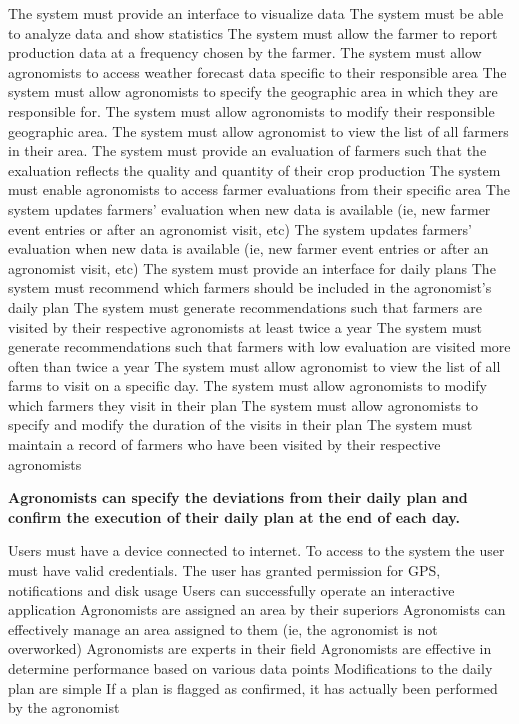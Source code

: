 \begin{itemize}
\begin{itemize}
 The system must provide an interface to visualize data
 The system must be able to analyze data and show statistics
 The system must allow the farmer to report production data at a frequency chosen by the farmer.
 The system must allow agronomists to access weather forecast data specific to their responsible area
 The system must allow agronomists to specify the geographic area in which they are responsible for.
 The system must allow agronomists to modify their responsible geographic area.
  The system must allow agronomist to view the list of all farmers in their area.
  The system must provide an evaluation of farmers such that the exaluation reflects the quality and quantity of their crop production
  The system must enable agronomists to access farmer evaluations from their specific area
  The system updates farmers' evaluation when new data is available (ie, new farmer event entries or after an agronomist visit, etc)
  The system updates farmers' evaluation when new data is available (ie, new farmer event entries or after an agronomist visit, etc)
  The system must provide an interface for daily plans
  The system must recommend which farmers should be included in the agronomist's daily plan
  The system must generate recommendations such that farmers are visited by their respective agronomists at least twice a year
  The system must generate recommendations such that farmers with low evaluation are visited more often than twice a year
  The system must allow agronomist to view the list of all farms to visit on a specific day.
  The system must allow agronomists to modify which farmers they visit in their plan
  The system must allow agronomists to specify and modify the duration of the visits in their plan
  The system must maintain a record of farmers who have been visited by their respective agronomists
\end{itemize}

 \textbf{Agronomists can specify the deviations from their daily plan and confirm the execution of their daily plan at the end of each day.}
\begin{itemize}
  Users must have a device connected to internet.
 To access to the system the user must have valid credentials.
 The user has granted permission for GPS, notifications and disk usage
 Users can successfully operate an interactive application
 Agronomists are assigned an area by their superiors
 Agronomists can effectively manage an area assigned to them (ie, the agronomist is not overworked)
 Agronomists are experts in their field
 Agronomists are effective in determine performance based on various data points
 Modifications to the daily plan are simple
 If a plan is flagged as confirmed, it has actually been performed by the agronomist



\end{itemize}
\end{itemize}
